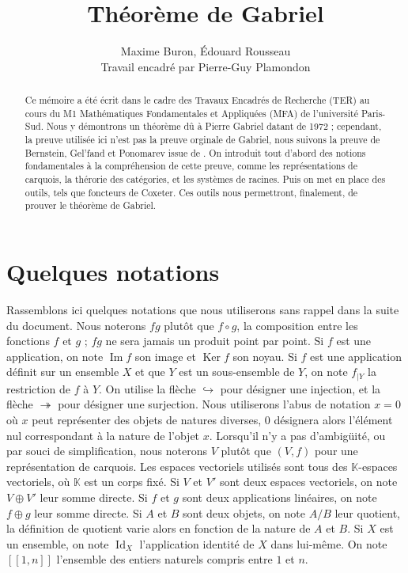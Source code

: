\documentclass[a4paper,11pt]{article}
\title{Théorème de Gabriel}
\author{Maxime Buron, Édouard Rousseau\\
Travail encadré par Pierre-Guy Plamondon}
\DeclareMathOperator{\Ker}{Ker}
\DeclareMathOperator{\Id}{Id}
\DeclareMathOperator{\Img}{Im}
\begin{document}
\maketitle

\begin{abstract} 
	Ce mémoire a été écrit dans le cadre des Travaux Encadrés de Recherche (TER) au cours du M1 Mathématiques Fondamentales et Appliquées (MFA) de l'université Paris-Sud. Nous y démontrons un théorème dû à Pierre Gabriel datant de 1972 ; cependant, la preuve utilisée ici n'est pas la preuve orginale de Gabriel, nous suivons la preuve de Bernstein, Gel'fand et Ponomarev issue de \cite{BGP72}. On introduit tout d'abord des notions fondamentales à la compréhension de cette preuve, comme les représentations de carquois, la thérorie des catégories, et les systèmes de racines. Puis on met en place des outils, tels que foncteurs de Coxeter. Ces outils nous permettront, finalement, de prouver le théorème de Gabriel.
\end{abstract}

\tableofcontents

\clearpage
\section*{Quelques notations}
Rassemblons ici quelques notations que nous utiliserons sans rappel dans la suite du document. Nous noterons $fg$ plutôt que $f\circ g$, la composition entre les fonctions $f$ et $g$ ; $fg$ ne sera jamais un produit point par point. Si $f$ est une application, on note $\Img f$ son image et $\Ker f$ son noyau. Si $f$ est une application définit sur un ensemble $X$ et que $Y$ est un sous-ensemble de $Y$, on note $f_{|Y}$ la restriction de $f$ à $Y$. On utilise la flèche $\hookrightarrow$ pour désigner une injection, et la flèche $\twoheadrightarrow$ pour désigner une surjection. Nous utiliserons l'abus de notation $x=0$ où $x$ peut représenter des objets de natures diverses, $0$ désignera alors l'élément nul correspondant à la nature de l'objet $x$. Lorsqu'il n'y a pas d'ambigüité, ou par souci de simplification, nous noterons $V$ plutôt que $(V,f)$ pour une représentation de carquois. Les espaces vectoriels utilisés sont tous des $\mathbb K$-espaces vectoriels, où $\mathbb K$ est un corps fixé. Si $V$ et $V'$ sont deux espaces vectoriels, on note $V\oplus V'$ leur somme directe. Si $f$ et $g$ sont deux applications linéaires, on note $f\oplus g$ leur somme directe. Si $A$ et $B$ sont deux objets, on note $A/B$ leur quotient, la définition de quotient varie alors en fonction de la nature de $A$ et $B$. Si $X$ est un ensemble, on note $\Id_X$ l'application identité de $X$ dans lui-même.  On note $[\![1,n]\!]$ l'ensemble des entiers naturels compris entre $1$ et $n$. 
        
\end{document}
